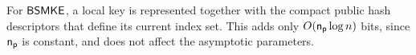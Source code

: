 %
%
For ${\mathsf{BSMKE}}$, a local key is represented together with the compact public hash descriptors that define its current index set. This adds only $O(\mathsf{n_p}\log n)$ bits, since $\mathsf{n_p}$ is constant, and does not affect the asymptotic parameters.
